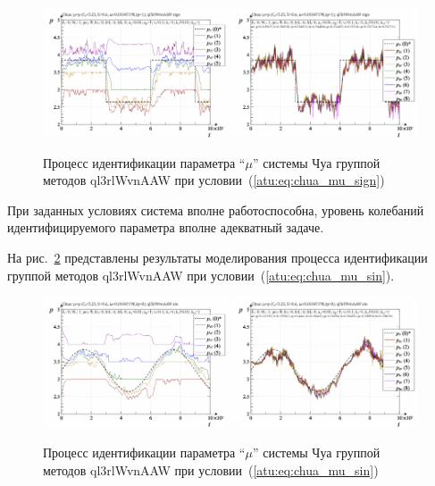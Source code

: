 \begin{figure}[htb!]
  \centerline{
    \includegraphics[width=0.49\textwidth]{p/cha/chua/ql3rlWvnAAW/chua_id-p_t_pi_ql3rlWvnAAW_sign.png}
    \hfill
    \includegraphics[width=0.49\textwidth]{p/cha/chua/ql3rlWvnAAW/chua_id-p_t_p_ql3rlWvnAAW_sign.png}
  }
  \caption{Процесс идентификации параметра ``$\mu$'' системы Чуа группой методов ql3rlWvnAAW при условии~(\ref{atu:eq:chua_mu_sign})}
  \label{atu:f:chua_id_ql3rlWvnAAW_sign}
\end{figure}

При заданных условиях система вполне работоспособна,
уровень колебаний идентифицируемого параметра вполне адекватный задаче.

На рис.~\ref{atu:f:chua_id_ql3rlWvnAAW_sin} представлены результаты
моделирования процесса идентификации
группой методов ql3rlWvnAAW при условии~(\ref{atu:eq:chua_mu_sin}).

\begin{figure}[htb!]
  \centerline{
    \includegraphics[width=0.49\textwidth]{p/cha/chua/ql3rlWvnAAW/chua_id-p_t_pi_ql3rlWvnAAW_sin.png}
    \hfill
    \includegraphics[width=0.49\textwidth]{p/cha/chua/ql3rlWvnAAW/chua_id-p_t_p_ql3rlWvnAAW_sin.png}
  }
  \caption{Процесс идентификации параметра ``$\mu$'' системы Чуа группой методов ql3rlWvnAAW при условии~(\ref{atu:eq:chua_mu_sin})}
  \label{atu:f:chua_id_ql3rlWvnAAW_sin}
\end{figure}

